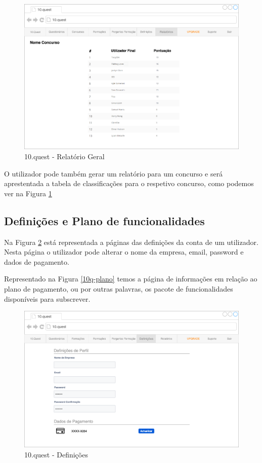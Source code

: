 \begin{figure}[ht!]
	\begin{center}
		\includegraphics[width=1\textwidth]{img/prototipos/rl.png}
		\caption{10.quest - Relatório Geral}
		\label{10q-t}
	\end{center}
\end{figure}

O utilizador pode também gerar um relatório para um concurso e será aprestentada a tabela de classificações para o respetivo concurso, como podemos ver na Figura \ref{10q-t}

\newpage

\subsection{Definições e Plano de funcionalidades}

Na Figura \ref{10q-def} está representada a páginas das definições da conta de um utilizador. Nesta página o utilizador pode alterar o nome da empresa, email, password e dados de pagamento.

Representado na Figura \ref{10q-plano} temos a página de informações em relação ao plano de pagamento, ou por outras palavras, os pacote de funcionalidades disponíveis para subscrever.

\begin{figure}[ht!]
	\begin{center}
		\includegraphics[width=1\textwidth]{img/prototipos/20.png}
		\caption{10.quest - Definições}
		\label{10q-def}
	\end{center}
\end{figure}


